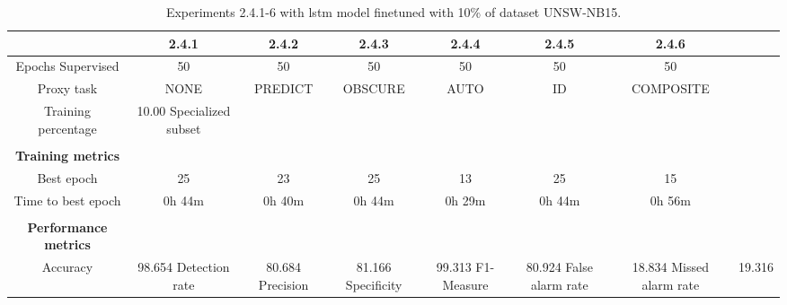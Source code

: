 \begin{table}[htb]
    \centering
    \begin{tabular}{@{}ccccccc@{}}
        \toprule
         & 2.4.1 & 2.4.2 & 2.4.3 & 2.4.4 & 2.4.5 & 2.4.6 \\
        \midrule
        Epochs Supervised &  50 &  50 &  50 &  50 &  50 &  50 \\
        Proxy task &  NONE &  PREDICT &  OBSCURE &  AUTO &  ID &  COMPOSITE \\
        Training percentage &  10.00 %
        Specialized subset &   &   &   &   &   &   \\
         \\
        \textbf{Training metrics} &  &  &  &  &  &  \\
        Best epoch &  25 &  23 &  25 &  13 &  25 &  15 \\
        Time to best epoch &  0h 44m &  0h 40m &  0h 44m &  0h 29m &  0h 44m &  0h 56m \\
         \\
        \textbf{Performance metrics} &  &  &  &  &  &  \\
        Accuracy &  98.654 %
        Detection rate &  80.684 %
        Precision &  81.166 %
        Specificity &  99.313 %
        F1-Measure &  80.924 %
        False alarm rate &  18.834 %
        Missed alarm rate &  19.316 %
        \bottomrule
    \end{tabular}
    \caption{Experiments 2.4.1-6 with \gls{lstm} model finetuned with 10\% of dataset UNSW-NB15.}
    \label{table:results:lstm:stats_flows15_10}
\end{table}